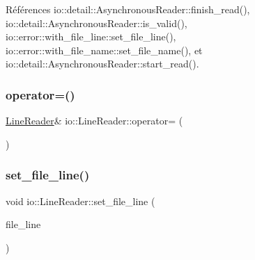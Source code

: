 Références io\+::detail\+::\+Asynchronous\+Reader\+::finish\+\_\+read(), io\+::detail\+::\+Asynchronous\+Reader\+::is\+\_\+valid(), io\+::error\+::with\+\_\+file\+\_\+line\+::set\+\_\+file\+\_\+line(), io\+::error\+::with\+\_\+file\+\_\+name\+::set\+\_\+file\+\_\+name(), et io\+::detail\+::\+Asynchronous\+Reader\+::start\+\_\+read().

\mbox{\label{classio_1_1LineReader_a9ebd7beca16060ffc0ea8df3c0c6ff25}} 
\subsubsection{\texorpdfstring{operator=()}{operator=()}}
{\footnotesize\ttfamily \hyperlink{classio_1_1LineReader}{Line\+Reader}\& io\+::\+Line\+Reader\+::operator= (\begin{DoxyParamCaption}\item[{const \hyperlink{classio_1_1LineReader}{Line\+Reader} \&}]{ }\end{DoxyParamCaption})\hspace{0.3cm}{\ttfamily [delete]}}

\mbox{\label{classio_1_1LineReader_a581b55d4ced6adb964de50fa8ac6eb08}} 
\subsubsection{\texorpdfstring{set\+\_\+file\+\_\+line()}{set\_file\_line()}}
{\footnotesize\ttfamily void io\+::\+Line\+Reader\+::set\+\_\+file\+\_\+line (\begin{DoxyParamCaption}\item[{unsigned}]{file\+\_\+line }\end{DoxyParamCaption})\hspace{0.3cm}{\ttfamily [inline]}}

\mbox{\label{classio_1_1LineReader_a1a0763d491dec16cebc33134e965dfee}} 
